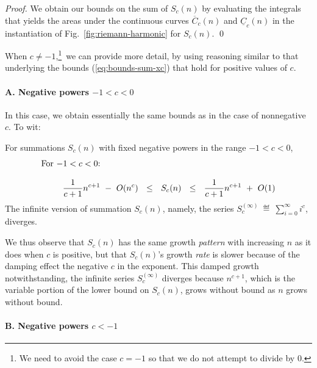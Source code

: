 \begin{proof}
We obtain our bounds on the sum of $S_c(n)$ by evaluating the integrals that yields the areas
under the continuous curves $\overline{C}_c(n)$ and $ \underline{C}_c(n)$ in the instantiation of Fig.~\ref{fig:riemann-harmonic} for $S_c(n)$.  \qed
\end{proof}

When $c \neq -1$,\footnote{We need to avoid the case $c = -1$ so that we do not attempt to divide by $0$.}~we can provide more detail, by using reasoning similar to that underlying the bounds (\ref{eq:bounds-sum-xc}) that hold for positive values of $c$.

\paragraph{A. Negative powers $-1 < c < 0$}

In this case, we obtain essentially the same bounds as in the case of nonnegative $c$.  To wit:

\begin{prop}
\label{thm:bounds-(-1)<c<0}
For summations $S_c(n)$ with fixed negative powers in the range $-1 < c<0$,
\begin{equation}
\label{eq:bounds-(-1)<c<0}
\begin{array}{l}
\mbox{For $-1 < c< 0$:} \\
 \\
\hspace*{.35in}
{\displaystyle \frac{1}{c+1} n^{c+1} \ - \ O(n^c)}
  \ \ \leq \ \ S_c(n)
  \ \ \leq \ \
{\displaystyle \frac{1}{c+1} n^{c+1} \ + \ O(1)}
\end{array}
\end{equation}
The infinite version of summation $S_c(n)$, namely, the series
$\displaystyle S_c^{(\infty)} \ \eqdef \ \sum_{i=0}^\infty i^c$,
diverges.
\end{prop}

We thus observe that $S_c(n)$ has the same growth {\em pattern} with increasing $n$ as it does when $c$ is positive, but that $S_c(n)$'s growth {\em rate} is slower because of the damping effect the negative $c$ in the exponent.  This damped growth notwithstanding, the infinite series $S_c^{(\infty)}$ diverges because $n^{c+1}$, which is the variable portion of the lower bound on $S_c(n)$, grows without bound as $n$ grows without bound.

\paragraph{B. Negative powers $c < -1$}

